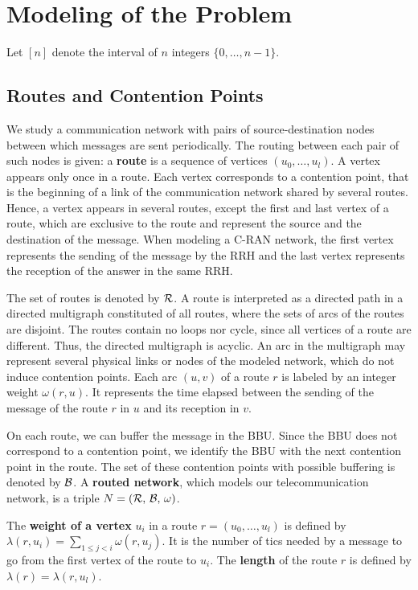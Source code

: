 \documentclass[a4paper,10pt]{article}
\begin{document}
\section{Modeling of the Problem}\label{sec:def}

Let $[n]$ denote the interval of $n$ integers $\{0,\dots,n-1\}$.


	\subsection{Routes and Contention Points}

  	We study a communication network with pairs of source-destination nodes between which messages are sent periodically. The routing between each pair of such nodes is given: a \textbf{route} is a sequence of vertices $(u_0, \ldots , u_{l})$. A vertex appears only once in a route. Each vertex corresponds to a contention point, that is the beginning of a link of the communication network shared by several routes. Hence, a vertex appears in several routes, except the first and last vertex of a route, which are exclusive to the route and represent the source and the destination of the message. When modeling a C-RAN network, the first vertex represents the sending of the message by the RRH and the last vertex represents the reception of the answer in the same RRH. 

  	The set of routes is denoted by ${\cal R}$. A route is interpreted as a directed path in a directed multigraph constituted of all routes, where the sets of arcs of the routes are disjoint. The routes contain no loops nor cycle, since all vertices of a route are different. Thus, the directed multigraph is acyclic. An arc in the multigraph may represent several physical links or nodes of the modeled network, which do not induce contention points. Each arc $(u,v)$ of a route $r$ is labeled by an integer weight $\omega(r,u)$. It represents the time elapsed between the sending of the message of the route $r$ in $u$ and its reception in $v$.

  	On each route, we can buffer the message in the BBU. Since the BBU does not correspond to a contention point, we identify the BBU with the next contention point in the route. The set of these contention points with possible buffering is denoted by ${\cal B}$.
  	A \textbf{routed network}, which models our telecommunication network, is a triple $N = (\cal{R},\,\cal{B},\,\omega)$. 


    The {\bf weight of a vertex} $u_i$ in a route $r=(u_0,\dots,u_l)$ is defined by $\lambda(r,u_i)= \sum\limits_{1 \leq j <i} \omega(r,u_j)$. It is the number of tics needed by a message to go from the first vertex of the route to $u_i$. The \textbf{length} of the route $r$ is defined by $\lambda(r)= \lambda(r,u_l)$. 
\end{document}
